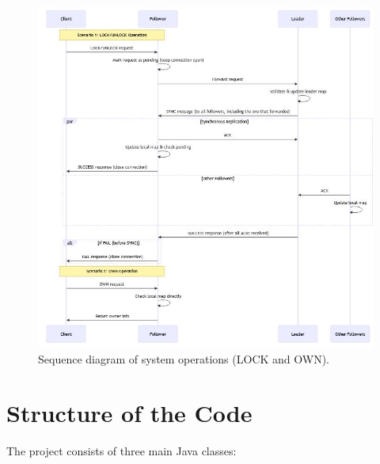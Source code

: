 \documentclass[a4paper,11pt]{article}
\begin{document}
\begin{figure}[htbp]
    \centering
    \includegraphics[width=0.85\linewidth]{images/capture_architecture_from_readme.JPG}
    \caption{Sequence diagram of system operations (LOCK and OWN).}
    \label{fig:mermaid}
\end{figure}

\newpage
\section{Structure of the Code}
The project consists of three main Java classes:
\end{document}
